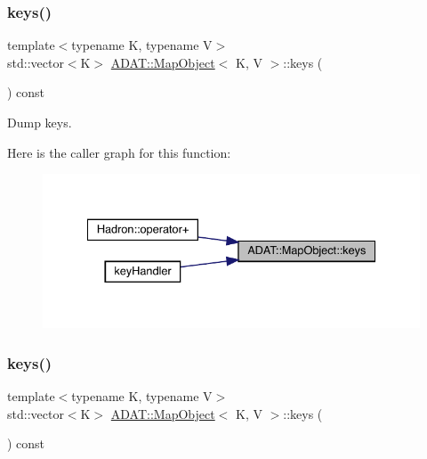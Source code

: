 \subsubsection{\texorpdfstring{keys()}{keys()}\hspace{0.1cm}{\footnotesize\ttfamily [1/2]}}
{\footnotesize\ttfamily template$<$typename K, typename V$>$ \\
std\+::vector$<$K$>$ \mbox{\hyperlink{classADAT_1_1MapObject}{A\+D\+A\+T\+::\+Map\+Object}}$<$ K, V $>$\+::keys (\begin{DoxyParamCaption}{ }\end{DoxyParamCaption}) const\hspace{0.3cm}{\ttfamily [inline]}}



Dump keys. 

Here is the caller graph for this function\+:\nopagebreak
\begin{figure}[H]
\begin{center}
\leavevmode
\includegraphics[width=334pt]{da/d29/classADAT_1_1MapObject_af767d0e9da82e3a249d3340d57da66e1_icgraph}
\end{center}
\end{figure}
\mbox{\label{classADAT_1_1MapObject_af767d0e9da82e3a249d3340d57da66e1}} 
\subsubsection{\texorpdfstring{keys()}{keys()}\hspace{0.1cm}{\footnotesize\ttfamily [2/2]}}
{\footnotesize\ttfamily template$<$typename K, typename V$>$ \\
std\+::vector$<$K$>$ \mbox{\hyperlink{classADAT_1_1MapObject}{A\+D\+A\+T\+::\+Map\+Object}}$<$ K, V $>$\+::keys (\begin{DoxyParamCaption}{ }\end{DoxyParamCaption}) const\hspace{0.3cm}{\ttfamily [inline]}}




